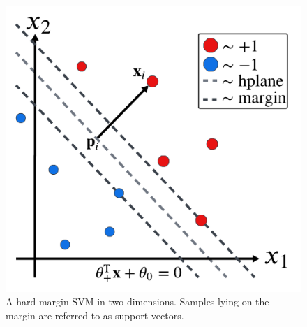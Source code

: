 \documentclass[11pt]{article}
\begin{document}
\begin{figure}[t]
    \centering
    \begin{minipage}{0.62\linewidth}
        \includegraphics[width=\linewidth]{./figures/supervised_learning/SVM_hard_margin.pdf}
    \end{minipage}%
    \hfill
    \begin{minipage}{0.35\linewidth}
        \caption{A hard-margin SVM in two dimensions. Samples lying on the margin are referred to as support vectors.}
        \label{fig:SVM_hard_margin}
    \end{minipage}
\end{figure}
\end{document}
